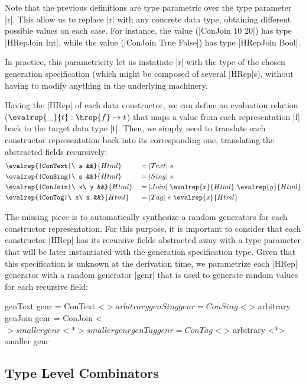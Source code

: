 Note that the previous definitions are type parametric over the type parameter
|r|.
%
This allow us to replace |r| with any concrete data type, obtaining different
possible values on each case.
%
For instance, the value (|ConJoin 10 20|) has type |HRepJoin Int|, while the
value (|ConJoin True False|) has type |HRepJoin Bool|.


In practice, this parametricity let us instatiate |r| with the type of the
chosen generation specification (which might be composed of several |HRep|s),
without having to modify anything in the underlying machinery.


Having the |HRep| of each data constructor, we can define an evaluation relation
($\evalrep{\_}{t} : \hrep{f} \rightarrow t$) that maps a value from each
representation |f| back to the target data type |t|.
%
Then, we simply need to translate each constructor representation back into its
corresponding one, translating the abstracted fields recursively:
%
\begin{alignat*}{4}
  &\evalrep{|ConText|\ s &&}{Html}
    &&= |Text|\ s \\
  &\evalrep{|ConSing|\ s &&}{Html}
    &&= |Sing|\ s \\
  &\evalrep{|ConJoin|\ x\ y &&}{Html}
    &&= |Join|\ \evalrep{x}{Html}\ \evalrep{y}{Html} \\
  &\evalrep{|ConTag|\ s\ x &&}{Html}
    &&= |Tag|\ s\ \evalrep{x}{Html}
\end{alignat*}

The missing piece is to automatically synthesize a random generators for each
constructor representation.
%
For this purpose, it is important to consider that each constructor |HRep| has
its recursive fields abstracted away with a type parameter that will be later
instantiated with the generation specification type.
%
Given that this specification is unknown at the derivation time, we parametrize
each |HRep| generator with a random generator |genr| that is used to generate
random values for each recursive field:

\begin{code}
  genText  genr  = ConText  <$> arbitrary
  genSing  genr  = ConSing  <$> arbitrary
  genJoin  genr  = ConJoin  <$> smaller genr <*> smaller genr
  genTag   genr  = ConTag   <$> arbitrary <*> smaller genr
\end{code}


\subsection*{\textbf{Type Level Combinators}}

